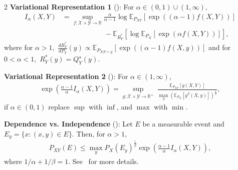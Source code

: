 \documentclass{article}
\numberwithin{theorem}{section}
\numberwithin{example}{section}
\numberwithin{remark}{section}
\numberwithin{definition}{section}
\newcommand{\E}{\mathbb{E}}
\newcommand{\X}{\mathcal{X}}
\begin{document}
\begin{table}[tbp]
{\begin{minipage}[t][60\baselineskip][t]{\textwidth}
\begin{multicols}{2}
\vspace{-1em}
\textbf{Variational Representation 1} (): For $\alpha \in (0,1) \cup (1,\infty),$
 \begin{align*}
    I_\alpha(X,Y) &= \sup_{f:\X\times\mathcal{Y}\to\mathbb{R}} \frac{\alpha}{\alpha-1} \log \E_{P_{XY}}[\exp\left((\alpha-1)f(X,Y)\right)] \\
    &\hspace{6em} - \E_{R_Y^*} [\log \E_{P_X}[\exp\left(\alpha f(X,Y)\right)]] ,
    \end{align*}
where for $\alpha>1,$
$\frac{dR_Y^*}{dP_Y}(y) \propto \E_{P_{X|Y=y}} \left[\exp\left((\alpha-1)f(X,y)\right) \right]$
and for $0<\alpha<1,$ $R_Y^{*}(y) = Q_Y^\star(y).$
\vspace{\belowdisplayskip}

\textbf{Variational Representation 2} (): For $\alpha \in (1,\infty)$,
\begin{align*}
\exp\left(\frac{\alpha-1}{\alpha}I_\alpha(X,Y)\right)\! =\!\!\!\! \sup_{g:\X\times\mathcal{Y}\to\mathbb{R}^+}\!\!\ \frac{\E_{P_{XY}}[g(X,Y)]}{\max_y \left(\E_{P_X}[g^\beta(X,y)]\right)^\frac1\beta },
\end{align*}if $\alpha\in (0,1)$ replace $\sup$ with $\inf$, and $\max$ with $\min$.
\vspace{\belowdisplayskip}

      \textbf{Dependence vs. Independence }(): Let $E$ be a measurable event and $E_y=\{ x: (x,y)\in E\}$. Then, for $\alpha>1,$
\begin{align*}    P_{XY}(E) \leq \max_y P_X(E_y)^\frac1\beta\exp\left(\frac{\alpha-1}{\alpha}I_\alpha(X,Y)\right),
\end{align*}
where $1/\alpha + 1/\beta =1.$ See~ for more details.\vspace{\belowdisplayskip}


\end{multicols}
\end{minipage}}
\end{table}
\end{document}
